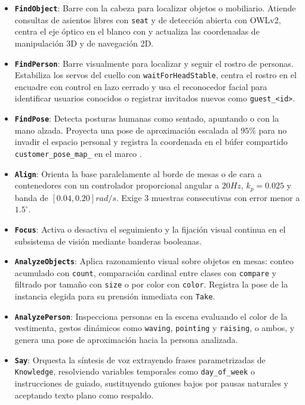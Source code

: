 \begin{itemize}
    \item \textbf{\texttt{FindObject}}: Barre con la cabeza para localizar objetos o mobiliario. Atiende consultas de asientos libres con \texttt{seat} y de detección abierta con OWLv2, centra el eje óptico en el blanco con  y actualiza las coordenadas de manipulación 3D y de navegación 2D.

    \item \textbf{\texttt{FindPerson}}: Barre visualmente para localizar y seguir el rostro de personas. Estabiliza los servos del cuello con \texttt{waitForHeadStable}, centra el rostro en el encuadre con control en lazo cerrado y usa el reconocedor facial para identificar usuarios conocidos o registrar invitados nuevos como \texttt{guest\_<id>}.

    \item \textbf{\texttt{FindPose}}: Detecta posturas humanas como sentado, apuntando o con la mano alzada. Proyecta una pose de aproximación escalada al $95\%$ para no invadir el espacio personal y registra la coordenada en el búfer compartido \texttt{customer\_pose\_map\_} en el marco .

    \item \textbf{\texttt{Align}}: Orienta la base paralelamente al borde de mesas o de cara a contenedores con un controlador proporcional angular a $20Hz$, $k_p = 0.025$ y banda de $[0.04, 0.20]rad/s$. Exige 3 muestras consecutivas con error menor a $1.5^\circ$.

    \item \textbf{\texttt{Focus}}: Activa o desactiva el seguimiento y la fijación visual continua en el subsistema de visión mediante banderas booleanas.

    \item \textbf{\texttt{AnalyzeObjects}}: Aplica razonamiento visual sobre objetos en mesas: conteo acumulado con \texttt{count}, comparación cardinal entre clases con \texttt{compare} y filtrado por tamaño con \texttt{size} o por color con \texttt{color}. Registra la pose de la instancia elegida para su prensión inmediata con \texttt{Take}.

    \item \textbf{\texttt{AnalyzePerson}}: Inspecciona personas en la escena evaluando el color de la vestimenta, gestos dinámicos como \texttt{waving}, \texttt{pointing} y \texttt{raising}, o ambos, y genera una pose de aproximación hacia la persona analizada.

    \item \textbf{\texttt{Say}}: Orquesta la síntesis de voz extrayendo frases parametrizadas de \texttt{Knowledge}, resolviendo variables temporales como \texttt{day\_of\_week} o instrucciones de guiado, sustituyendo guiones bajos por pausas naturales y aceptando texto plano como respaldo.


\end{itemize}
